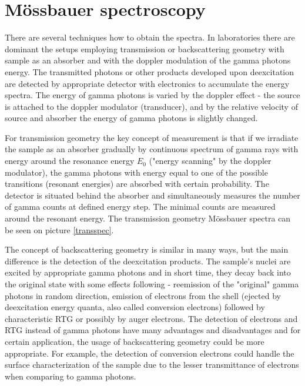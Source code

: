 \section{Mössbauer spectroscopy}
There are several techniques how to obtain the spectra. In laboratories there are dominant the setups employing transmission or backscattering geometry with sample as an absorber and with the doppler modulation of the gamma photons energy. The transmitted photons or other products developed upon deexcitation are detected by appropriate detector with electronics to accumulate the energy spectra. The energy of gamma photons is varied by the doppler effect - the source is attached to the doppler modulator (transducer), and by the relative velocity of source and absorber the energy of gamma photons is slightly changed.
\par
For transmission geometry the key concept of measurement is that if we irradiate the sample as an absorber gradually by continuous spectrum of gamma rays with energy around the resonance energy $E_0$ ("energy scanning" by the doppler modulator), the gamma photons with energy equal to one of the possible transitions (resonant energies) are absorbed with certain probability. 
The detector is situated behind the absorber and simultaneously measures the number of gamma counts at defined energy step. The minimal counts are measured around the resonant energy. The transmission geometry Mössbauer spectra can be seen on picture \ref{transspec}.

\par
The concept of backscattering geometry is similar in many ways, but the main difference is the detection of the deexcitation products. The sample's nuclei are excited by appropriate gamma photons and in short time, they decay back into the original state with some effects following - reemission of the "original" gamma photons in random direction, emission of electrons from the shell (ejected by deexcitation energy quanta, also called conversion electrons) followed by characteristic RTG or possibly by auger electrons. The detection of electrons and RTG instead of gamma photons have many advantages and disadvantages and for certain application, the usage of backscattering geometry could be more appropriate. For example, the detection of conversion electrons could handle the surface characterization of the sample due to the lesser transmittance of electrons when comparing to gamma photons.


